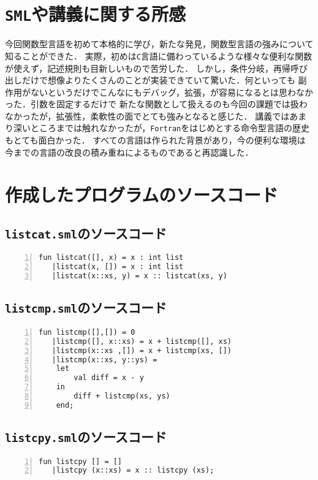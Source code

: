 \documentclass[autodetect-engine,dvi=dvipdfmx,ja=standard,
               a4j,11pt]{bxjsarticle}
\begin{document}
\section{\texttt{SML}や講義に関する所感}
今回関数型言語を初めて本格的に学び，新たな発見，関数型言語の強みについて知ることができた．
実際，初めは\verb|C|言語に備わっているような様々な便利な関数が使えず，記述規則も目新しいもので苦労した．
しかし，条件分岐，再帰呼び出しだけで想像よりたくさんのことが実装できていて驚いた．何といっても
副作用がないというだけでこんなにもデバッグ，拡張，が容易になるとは思わなかった．引数を固定するだけで
新たな関数として扱えるのも今回の課題では扱わなかったが，拡張性，柔軟性の面でとても強みとなると感じた．
講義ではあまり深いところまでは触れなかったが，\verb|Fortran|をはじめとする命令型言語の歴史もとても面白かった．
すべての言語は作られた背景があり，今の便利な環境は今までの言語の改良の積み重ねによるものであると再認識した．

\section{作成したプログラムのソースコード} \label{code}
\subsection{\texttt{listcat.sml}のソースコード} \label{listcat_code}
\begin{Verbatim}[numbers=left, xleftmargin=8mm, numbersep=6pt,
    fontsize=\small, baselinestretch=0.8]
fun listcat([], x) = x : int list
   |listcat(x, []) = x : int list
   |listcat(x::xs, y) = x :: listcat(xs, y)
\end{Verbatim}
\subsection{\texttt{listcmp.sml}のソースコード} \label{listcmp_code}
\begin{Verbatim}[numbers=left, xleftmargin=8mm, numbersep=6pt,
    fontsize=\small, baselinestretch=0.8]
fun listcmp([],[]) = 0
   |listcmp([], x::xs) = x + listcmp([], xs)
   |listcmp(x::xs ,[]) = x + listcmp(xs, [])
   |listcmp(x::xs, y::ys) = 
    let
        val diff = x - y
    in
        diff + listcmp(xs, ys)
    end;
\end{Verbatim}
\subsection{\texttt{listcpy.sml}のソースコード} \label{listcpy_code}
\begin{Verbatim}[numbers=left, xleftmargin=8mm, numbersep=6pt,
    fontsize=\small, baselinestretch=0.8]
fun listcpy [] = []
   |listcpy (x::xs) = x :: listcpy (xs);
\end{Verbatim}
\end{document}
